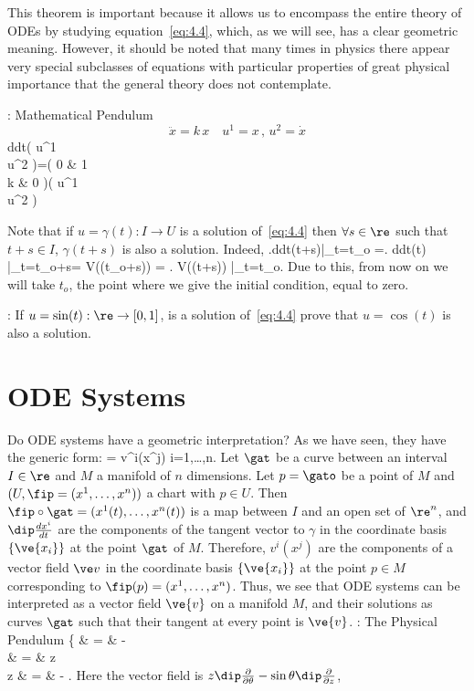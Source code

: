 This theorem is important because it allows us to encompass the entire theory
of ODEs by studying equation~\ref{eq:4.4}, 
which, as we will see, has a clear geometric meaning. 
However, it should be noted that many times in physics
there appear very special subclasses of equations with particular properties
of great physical importance that the general theory does not contemplate.

\ejem: Mathematical Pendulum
$$ \ddot x=k\,x \,\,\,\,\,\,u^1=x\,,\,u^2=\dot x$$
\beq \frac d{dt}\left(
                 u^1 \\ u^2
                 \earr \right)=\left(
                                0 & 1\\
                                k & 0
                                \earr\right)\left(
                                              u^1 \\ u^2
                                              \earr\right)
\eeq 

\espa
Note that if $u = \gamma(t): I \rightarrow U $ is a solution of~\ref{eq:4.4}
then $\forall s\in \re $ such that $t+s \in I$, $\gamma(t+s)$ is also
a solution. Indeed,
\beq
\left.\frac d{dt}\gamma(t+s)\right|_{t=t_o} =\left. \frac d{dt}\gamma(t) 
\right|_{t=t_o+s}= V(\gamma(t_o+s)) = \left. V(\gamma(t+s)) \right|_{t=t_o}.
\eeq
Due to this, from now on we will take $t_o$, the point where we give 
the initial condition, equal to zero.

\ejer:
If $u=\sin(t):\re \rightarrow [0,1]$, is a solution of~\ref{eq:4.4}
prove that $u=\cos(t)$ is also a solution.



\section{ODE Systems}

Do ODE systems have a geometric interpretation?
As we have seen, they have the generic form:
\beq
{} = v^i(x^j)\;\;\;\;\;\;\;\;\;\;\; i=1,\ldots,n.
\eeq
Let $\gat$ be a curve between an interval $I\in \re$ and $M$ a manifold of
$n$ dimensions. Let $p=\gato$ be a point of $M$ and
$(U,\fip=(x^1,\ldots,x^n))$ a chart with $p\in U$. Then
$\fip\circ\gat=(x^1(t) ,\ldots,x^n(t))$ is a map between $I$ and an
open set of $\re^n$, and $\dip\frac{dx^i}{dt}$ are the components of the
tangent vector to $\gamma$ in the coordinate basis $\{\ve{x_i}\}$ at the point
$\gat$ of $M$. Therefore, $v^i(x^j)$ are the components of a
vector field $\ve v$ in the coordinate basis $\{\ve{x_i}\}$ at the point
$p\in M$ corresponding to $\fip(p)=(x^1,\ldots,x^n)$. Thus, we see that
ODE systems can be interpreted as a vector field $\ve{v}$ on a manifold $M$, and their solutions as curves $\gat $ 
such that their tangent at every point is $\ve{v}$. 
\espa
\noi
\ejem: The Physical Pendulum
\beq
\left\{
   \ddot\theta  & = & -\sin\theta \;\;\;\;\mbox{} \\
   \dot \theta & = & z  \\
   \dot z & = & -\sin\theta 
   \earr\right.
\eeq
\noi
Here the vector field is $z\dip\frac{\partial}{\partial\theta} -
\sin \theta \dip\frac{\partial}{\partial z}$,

